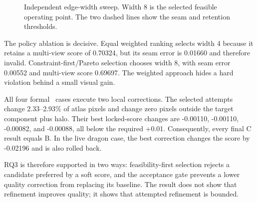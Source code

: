 \begin{figure}[t]
  \centering
  \caption{Independent edge-width sweep. Width 8 is the selected feasible
  operating point. The two dashed lines show the seam and retention thresholds.}
  \label{fig:edge-sweep}
\end{figure}

The policy ablation is decisive. Equal weighted ranking selects width 4 because it
retains a multi-view score of 0.70324, but its seam error is 0.01660 and therefore
invalid. Constraint-first/Pareto selection chooses width 8, with seam error
0.00552 and multi-view score 0.69697. The weighted approach hides a hard violation
behind a small visual gain.

All four formal \routeC\ cases execute two local corrections. The selected
attempts change 2.33--2.93\% of atlas pixels and change zero pixels outside the
target component plus halo. Their best locked-score changes are -0.00110,
-0.00110, -0.00082, and -0.00088, all below the required +0.01. Consequently,
every final C result equals B. In the live dragon case, the best correction changes
the score by -0.02196 and is also rolled back.

RQ3 is therefore supported in two ways: feasibility-first selection rejects a
candidate preferred by a soft score, and the acceptance gate prevents a lower
quality correction from replacing its baseline. The result does not show that
refinement improves quality; it shows that attempted refinement is bounded.

